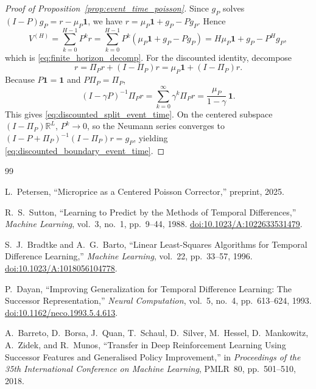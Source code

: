 \documentclass[11pt,twoside]{article}
\theoremstyle{plain}
\theoremstyle{definition}
\theoremstyle{remark}
\newcommand{\1}{\mathbf{1}}
\newcommand{\R}{\mathbb{R}}
\newcommand{\PiP}{\Pi_P}
\begin{document}
\begin{proof}[Proof of Proposition~\ref{prop:event_time_poisson}]
Since $g_P$ solves $(I-P)g_P=r-\mu_P\1$, we have $r=\mu_P\1+g_P-Pg_P$. Hence
\[
V^{(H)}
=
\sum_{k=0}^{H-1}P^k r
=
\sum_{k=0}^{H-1}P^k(\mu_P\1+g_P-Pg_P)
=
H\mu_P\1+g_P-P^H g_P,
\]
which is \eqref{eq:finite_horizon_decomp}. For the discounted identity, decompose
\[
r=\PiP r+(I-\PiP)r=\mu_P\1+(I-\PiP)r.
\]
Because $P\1=\1$ and $P\PiP=\PiP$,
\[
(I-\gamma P)^{-1}\PiP r=\sum_{k=0}^{\infty}\gamma^k\PiP r=\frac{\mu_P}{1-\gamma}\,\1.
\]
This gives \eqref{eq:discounted_split_event_time}. On the centered subspace $(I-\PiP)\R^L$, $P^k\to 0$, so the Neumann series converges to $(I-P+\PiP)^{-1}(I-\PiP)r=g_P$, yielding \eqref{eq:discounted_boundary_event_time}.
\end{proof}

\newpage
\begingroup
\small
\setlength{\itemsep}{3pt plus 1pt minus 1pt}
\setlength{\parsep}{0pt}
\begin{thebibliography}{99}

L.~Petersen, ``Microprice as a Centered Poisson Corrector,'' preprint, 2025.

R.~S.~Sutton, ``Learning to Predict by the Methods of Temporal Differences,'' \textit{Machine Learning}, vol.~3, no.~1, pp.~9--44, 1988. \href{https://doi.org/10.1023/A:1022633531479}{doi:10.1023/A:1022633531479}.

S.~J.~Bradtke and A.~G.~Barto, ``Linear Least-Squares Algorithms for Temporal Difference Learning,'' \textit{Machine Learning}, vol.~22, pp.~33--57, 1996. \href{https://doi.org/10.1023/A:1018056104778}{doi:10.1023/A:1018056104778}.

P.~Dayan, ``Improving Generalization for Temporal Difference Learning: The Successor Representation,'' \textit{Neural Computation}, vol.~5, no.~4, pp.~613--624, 1993. \href{https://doi.org/10.1162/neco.1993.5.4.613}{doi:10.1162/neco.1993.5.4.613}.

A.~Barreto, D.~Borsa, J.~Quan, T.~Schaul, D.~Silver, M.~Hessel, D.~Mankowitz, A.~Zidek, and R.~Munos, ``Transfer in Deep Reinforcement Learning Using Successor Features and Generalised Policy Improvement,'' in \textit{Proceedings of the 35th International Conference on Machine Learning}, PMLR~80, pp.~501--510, 2018.

\end{thebibliography}
\endgroup
\end{document}
